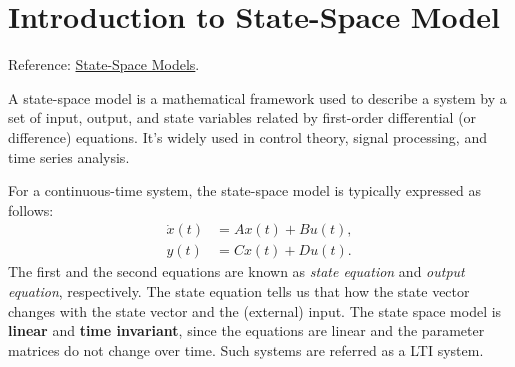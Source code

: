 \section{Introduction to State-Space Model}
\label{state:sec:ssm}
Reference: \href{http://apmonitor.com/pdc/index.php/Main/StateSpaceModel}{State-Space Models}.

A state-space model is a mathematical framework used to describe a system by a set of input, output, and state variables related by first-order differential (or difference) equations. It's widely used in control theory, signal processing, and time series analysis.


For a continuous-time system, the state-space model is typically expressed as follows:
\begin{align*}
	\dot{x}(t) &= {A}x(t)+{B}u(t),\\
	y(t) &= {C}x(t)+Du(t).
\end{align*}
The first and the second equations are known as \textit{state equation} and \textit{output equation}, respectively. The state equation tells us that how the state vector changes with the state vector and the (external) input. The state space model is \textbf{linear} and \textbf{time invariant}, since the equations are linear and the parameter matrices do not change over time. Such systems are referred as a LTI system. 

